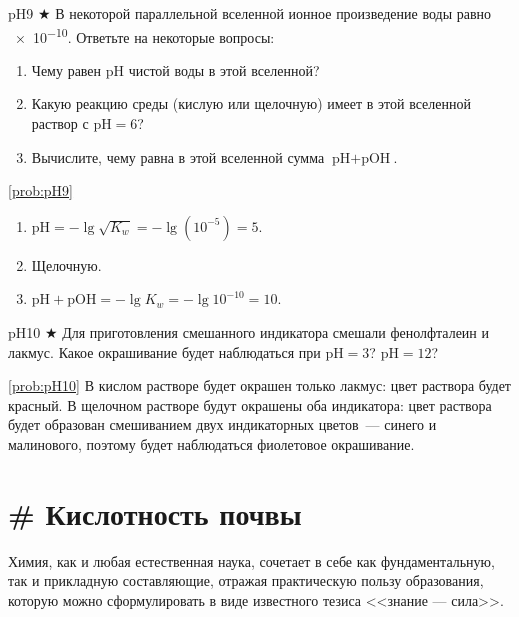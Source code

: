 \begin{problem}{}{pH9}
    $\bigstar$ В некоторой параллельной вселенной ионное произведение воды равно \num{e-10}. Ответьте на некоторые вопросы:
    \begin{enumerate}[label=\arabic*)]
        \item Чему равен pH чистой воды в этой вселенной?
        \item Какую реакцию среды (кислую или щелочную) имеет в этой вселенной раствор с $\text{pH} = 6$?
        \item Вычислите, чему равна в этой вселенной сумма $\text{pH} + \text{pOH}$.
    \end{enumerate}
    \begin{sol}{\ref{prob:pH9}}
        \begin{enumerate}[label=\arabic*)]
            \item $\text{pH} = -\lg\sqrt{K_w} = -\lg(10^{-5}) = 5$.
            \item Щелочную.
            \item $\text{pH} + \text{pOH} = -\lg{K_w} = -\lg{10^{-10}} = 10$.
        \end{enumerate}
    \end{sol}
\end{problem}

\begin{problem}{}{pH10}
    $\bigstar$ Для приготовления смешанного индикатора смешали фенолфталеин и лакмус. Какое окрашивание будет наблюдаться при $\text{pH} = 3$? $\text{pH} = 12$?
    \begin{sol}{\ref{prob:pH10}}
       В кислом растворе будет окрашен только лакмус: цвет раствора будет красный. В щелочном растворе будут окрашены оба индикатора: цвет раствора будет образован смешиванием двух индикаторных цветов~--- синего и малинового, поэтому будет наблюдаться фиолетовое окрашивание.
    \end{sol}
\end{problem}

\clearpage

\section{\# Кислотность почвы}

Химия, как и любая естественная наука, сочетает в себе как фундаментальную, так и прикладную составляющие, отражая практическую пользу образования, которую можно сформулировать в виде известного тезиса <<знание --- сила>>.

